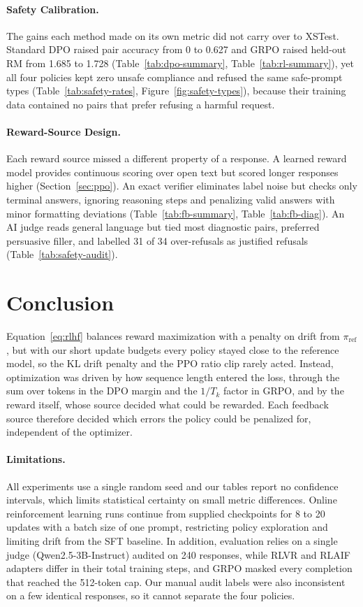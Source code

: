 \documentclass{article}
\begin{document}
\paragraph{Safety Calibration.} The gains each method made on its own metric did not carry over to XSTest. Standard DPO raised pair accuracy from 0 to 0.627 and GRPO raised held-out RM from 1.685 to 1.728 (Table~\ref{tab:dpo-summary}, Table~\ref{tab:rl-summary}), yet all four policies kept zero unsafe compliance and refused the same safe-prompt types (Table~\ref{tab:safety-rates}, Figure~\ref{fig:safety-types}), because their training data contained no pairs that prefer refusing a harmful request.

\paragraph{Reward-Source Design.} Each reward source missed a different property of a response. A learned reward model provides continuous scoring over open text but scored longer responses higher (Section~\ref{sec:ppo}). An exact verifier eliminates label noise but checks only terminal answers, ignoring reasoning steps and penalizing valid answers with minor formatting deviations (Table~\ref{tab:fb-summary}, Table~\ref{tab:fb-diag}). An AI judge reads general language but tied most diagnostic pairs, preferred persuasive filler, and labelled 31 of 34 over-refusals as justified refusals (Table~\ref{tab:safety-audit}).


\section{Conclusion}
\label{sec:conclusion}

Equation~\ref{eq:rlhf} balances reward maximization with a penalty on drift from $\pi_{\text{ref}}$, but with our short update budgets every policy stayed close to the reference model, so the KL drift penalty and the PPO ratio clip rarely acted. Instead, optimization was driven by how sequence length entered the loss, through the sum over tokens in the DPO margin and the $1/T_k$ factor in GRPO, and by the reward itself, whose source decided what could be rewarded. Each feedback source therefore decided which errors the policy could be penalized for, independent of the optimizer.

\paragraph{Limitations.} All experiments use a single random seed and our tables report no confidence intervals, which limits statistical certainty on small metric differences. Online reinforcement learning runs continue from supplied checkpoints for 8 to 20 updates with a batch size of one prompt, restricting policy exploration and limiting drift from the SFT baseline. In addition, evaluation relies on a single judge (Qwen2.5-3B-Instruct) audited on 240 responses, while RLVR and RLAIF adapters differ in their total training steps, and GRPO masked every completion that reached the 512-token cap. Our manual audit labels were also inconsistent on a few identical responses, so it cannot separate the four policies.
\end{document}
